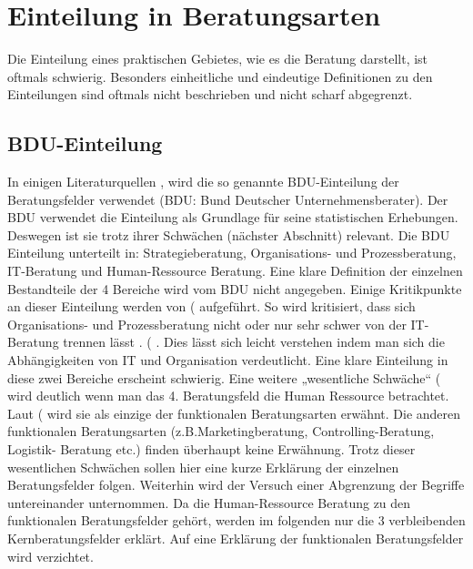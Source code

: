 \section{Einteilung in Beratungsarten}
Die Einteilung eines praktischen Gebietes, wie es die Beratung darstellt, ist oftmals schwierig. Besonders einheitliche und eindeutige Definitionen zu den Einteilungen sind oftmals nicht beschrieben und nicht scharf abgegrenzt. 

\subsection{BDU-Einteilung}
In einigen Literaturquellen \cite[54]{Lippold201309},\cite[4]{nissen2007consulting} wird die so genannte BDU-Einteilung der Beratungsfelder verwendet (BDU: Bund Deutscher Unternehmensberater). Der BDU verwendet die Einteilung als Grundlage für seine statistischen Erhebungen. Deswegen ist sie trotz ihrer Schwächen (nächster Abschnitt) relevant.
Die BDU Einteilung unterteilt in: Strategieberatung, Organisations- und Prozessberatung, IT-Beratung und Human-Ressource Beratung. Eine klare Definition der einzelnen Bestandteile der 4 Bereiche wird vom BDU nicht angegeben. Einige Kritikpunkte an dieser Einteilung werden von (\cite[54]{Lippold201309} aufgeführt. So wird kritisiert, \glqq [...] dass sich Organisations- und Prozessberatung nicht oder nur sehr schwer von der IT-Beratung trennen l\"asst \grqq. (\cite[54]{Lippold201309} . Dies lässt sich leicht verstehen indem man sich die Abhängigkeiten von IT und Organisation verdeutlicht. Eine klare Einteilung in diese zwei Bereiche erscheint schwierig. Eine weitere „wesentliche Schwäche“ (\cite[54]{Lippold201309}  wird deutlich wenn man das 4. Beratungsfeld die Human Ressource betrachtet. Laut (\cite[54]{Lippold201309} wird sie als einzige der funktionalen Beratungsarten erwähnt. Die anderen funktionalen Beratungsarten (z.B.Marketingberatung, Controlling-Beratung, Logistik- Beratung etc.) finden überhaupt keine Erwähnung.
Trotz dieser wesentlichen Schwächen sollen hier eine kurze Erklärung der einzelnen Beratungsfelder folgen. Weiterhin wird der Versuch einer Abgrenzung der Begriffe untereinander unternommen. Da die Human-Ressource Beratung zu den funktionalen Beratungsfelder gehört, werden im folgenden nur die 3 verbleibenden Kernberatungsfelder erklärt. Auf eine Erklärung der funktionalen Beratungsfelder wird verzichtet. 

